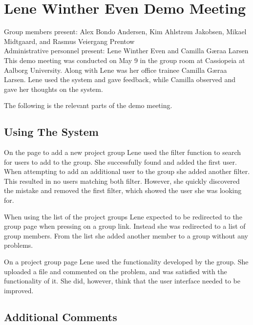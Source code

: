 \section{Lene Winther Even Demo Meeting}
\label{sec:lenedemotwo}
Group members present: Alex Bondo Andersen, Kim Ahlstr\o{}m Jakobsen, Mikael Midtgaard, and Rasmus Veiergang Prentow\\
Administrative personnel present: Lene Winther Even and Camilla G\ae{}raa Larsen\\

This demo meeting was conducted on May 9\ths{} in the group room at Cassiopeia at Aalborg University.
Along with Lene was her office trainee Camilla G\ae{}raa Larsen. 
Lene used the system and gave feedback, while Camilla observed and gave her thoughts on the system.

The following is the relevant parts of the demo meeting.

\subsection{Using The System}
On the page to add a new project group Lene used the filter function to search for users to add to the group.
She successfully found and added the first user.
When attempting to add an additional user to the group she added another filter. 
This resulted in no users matching both filter. 
However, she quickly discovered the mistake and removed the first filter, which showed the user she was looking for.

When using the list of the project groups Lene expected to be redirected to the group page when pressing on a group link.
Instead she was redirected to a list of group members.
From the list she added another member to a group without any problems.

On a project group page Lene used the functionality developed by the \supervisorgroup group.
She uploaded a file and commented on the problem, and was satisfied with the functionality of it.
She did, however, think that the user interface needed to be improved.

\subsection{Additional Comments}

